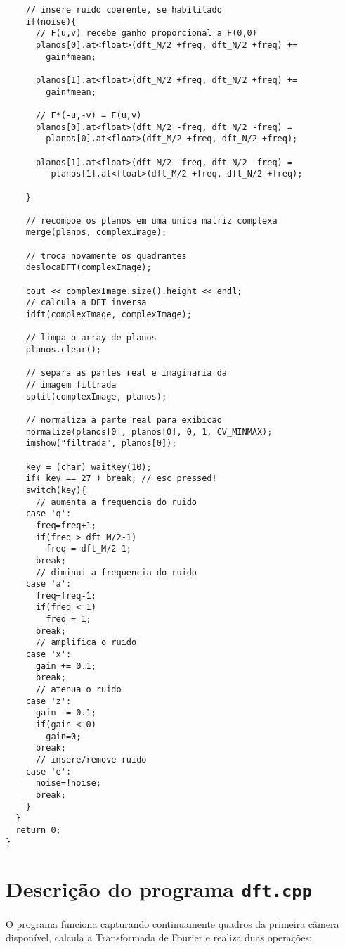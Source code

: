 \documentclass[11pt]{amsbook}
\begin{document}
\begin{verbatim}
    // insere ruido coerente, se habilitado
    if(noise){
      // F(u,v) recebe ganho proporcional a F(0,0)
      planos[0].at<float>(dft_M/2 +freq, dft_N/2 +freq) +=
        gain*mean;

      planos[1].at<float>(dft_M/2 +freq, dft_N/2 +freq) +=
        gain*mean;

      // F*(-u,-v) = F(u,v)
      planos[0].at<float>(dft_M/2 -freq, dft_N/2 -freq) =
        planos[0].at<float>(dft_M/2 +freq, dft_N/2 +freq);

      planos[1].at<float>(dft_M/2 -freq, dft_N/2 -freq) =
        -planos[1].at<float>(dft_M/2 +freq, dft_N/2 +freq);

    }

    // recompoe os planos em uma unica matriz complexa
    merge(planos, complexImage);

    // troca novamente os quadrantes
    deslocaDFT(complexImage);

	cout << complexImage.size().height << endl;
    // calcula a DFT inversa
    idft(complexImage, complexImage);

    // limpa o array de planos
    planos.clear();

    // separa as partes real e imaginaria da
    // imagem filtrada
    split(complexImage, planos);

    // normaliza a parte real para exibicao
    normalize(planos[0], planos[0], 0, 1, CV_MINMAX);
    imshow("filtrada", planos[0]);

    key = (char) waitKey(10);
    if( key == 27 ) break; // esc pressed!
    switch(key){
      // aumenta a frequencia do ruido
    case 'q':
      freq=freq+1;
      if(freq > dft_M/2-1)
        freq = dft_M/2-1;
      break;
      // diminui a frequencia do ruido
    case 'a':
      freq=freq-1;
      if(freq < 1)
        freq = 1;
      break;
      // amplifica o ruido
    case 'x':
      gain += 0.1;
      break;
      // atenua o ruido
    case 'z':
      gain -= 0.1;
      if(gain < 0)
        gain=0;
      break;
      // insere/remove ruido
    case 'e':
      noise=!noise;
      break;
    }
  }
  return 0;
}
\end{verbatim}

\hypertarget{x-descrição-do-programa-\texttt{dft.cpp}}{\section{Descrição do programa \texttt{dft.cpp}}}
O programa funciona capturando continuamente quadros da primeira
câmera disponível, calcula a Transformada de Fourier e realiza duas
operações:
\end{document}
